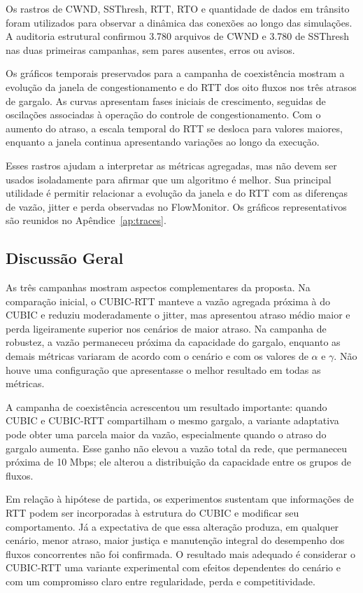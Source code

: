 \documentclass[a4paper,12pt]{monografia}
\begin{document}
Os rastros de CWND, SSThresh, RTT, RTO e quantidade de dados em trânsito foram utilizados para observar a dinâmica das conexões ao longo das simulações. A auditoria estrutural confirmou 3.780 arquivos de CWND e 3.780 de SSThresh nas duas primeiras campanhas, sem pares ausentes, erros ou avisos.

Os gráficos temporais preservados para a campanha de coexistência mostram a evolução da janela de congestionamento e do RTT dos oito fluxos nos três atrasos de gargalo. As curvas apresentam fases iniciais de crescimento, seguidas de oscilações associadas à operação do controle de congestionamento. Com o aumento do atraso, a escala temporal do RTT se desloca para valores maiores, enquanto a janela continua apresentando variações ao longo da execução.

Esses rastros ajudam a interpretar as métricas agregadas, mas não devem ser usados isoladamente para afirmar que um algoritmo é melhor. Sua principal utilidade é permitir relacionar a evolução da janela e do RTT com as diferenças de vazão, jitter e perda observadas no FlowMonitor. Os gráficos representativos são reunidos no Apêndice~\ref{ap:traces}.

\subsection{Discussão Geral}

As três campanhas mostram aspectos complementares da proposta. Na comparação inicial, o CUBIC-RTT manteve a vazão agregada próxima à do CUBIC e reduziu moderadamente o jitter, mas apresentou atraso médio maior e perda ligeiramente superior nos cenários de maior atraso. Na campanha de robustez, a vazão permaneceu próxima da capacidade do gargalo, enquanto as demais métricas variaram de acordo com o cenário e com os valores de $\alpha$ e $\gamma$. Não houve uma configuração que apresentasse o melhor resultado em todas as métricas.

A campanha de coexistência acrescentou um resultado importante: quando CUBIC e CUBIC-RTT compartilham o mesmo gargalo, a variante adaptativa pode obter uma parcela maior da vazão, especialmente quando o atraso do gargalo aumenta. Esse ganho não elevou a vazão total da rede, que permaneceu próxima de 10 Mbps; ele alterou a distribuição da capacidade entre os grupos de fluxos.

Em relação à hipótese de partida, os experimentos sustentam que informações de RTT podem ser incorporadas à estrutura do CUBIC e modificar seu comportamento. Já a expectativa de que essa alteração produza, em qualquer cenário, menor atraso, maior justiça e manutenção integral do desempenho dos fluxos concorrentes não foi confirmada. O resultado mais adequado é considerar o CUBIC-RTT uma variante experimental com efeitos dependentes do cenário e com um compromisso claro entre regularidade, perda e competitividade.
\end{document}
